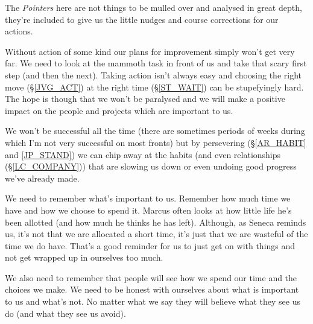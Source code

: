 \cleardoublepage
{\small

The \emph{Pointers} here are not things to be mulled over and analysed in great depth, they're included to give us the little nudges and course corrections for our actions.

Without action of some kind our plans for improvement simply won't get very far. We need to look at the mammoth task in front of us and take that scary first step (and then the next). 
Taking action isn't always easy and choosing the right move (\S \ref{JVG_ACT}) at the right time (\S \ref{ST_WAIT}) can be stupefyingly hard.
The hope is though that we won't be paralysed and we will make a positive impact on the people and projects which are important to us.

We won't be successful all the time (there are sometimes periods of weeks during which I'm not very successful on most fronts) but by persevering (\S \ref{AR_HABIT} and \ref{JP_STAND}) we can chip away at the habits (and even relationships (\S \ref{LC_COMPANY})) that are slowing us down or even undoing good progress we've already made.

We need to remember what's important to us. Remember how much time we have and how we choose to spend it. Marcus often looks at how little life he's been allotted (and how much he thinks he has left). Although, as Seneca reminds us, it's not that we are allocated a short time, it's just that we are wasteful of the time we do have. That's a good reminder for us to just get on with things and not get wrapped up in ourselves too much. 

We also need to remember that people will see how we spend our time and the choices we make. We need to be honest with ourselves about what is important to us and what's not. No matter what we say they will believe what they see us do (and what they see us avoid). 

}
